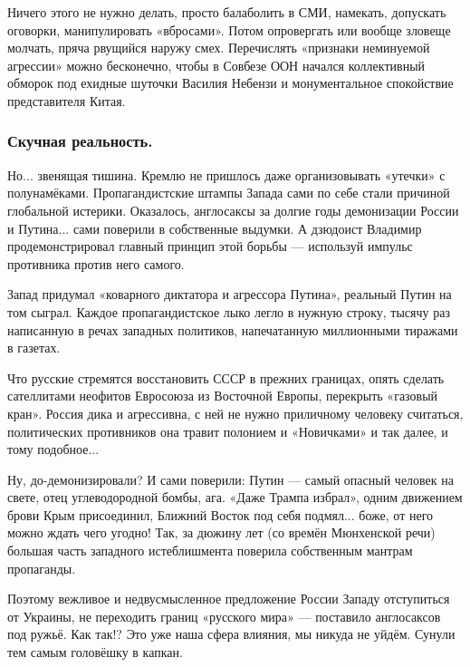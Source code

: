 
Ничего этого не нужно делать, просто балаболить в СМИ, намекать, допускать
оговорки, манипулировать «вбросами». Потом опровергать или вообще зловеще
молчать, пряча рвущийся наружу смех. Перечислять «признаки неминуемой агрессии»
можно бесконечно, чтобы в Совбезе ООН начался коллективный обморок под ехидные
шуточки Василия Небензи и монументальное спокойствие представителя Китая.

\subsubsection{Скучная реальность.}

Но... звенящая тишина. Кремлю не пришлось даже организовывать «утечки» с
полунамёками. Пропагандистские штампы Запада сами по себе стали причиной
глобальной истерики. Оказалось, англосаксы за долгие годы демонизации России и
Путина... сами поверили в собственные выдумки. А дзюдоист Владимир
продемонстрировал главный принцип этой борьбы — используй импульс противника
против него самого.

Запад придумал «коварного диктатора и агрессора Путина», реальный Путин на том
сыграл. Каждое пропагандистское лыко легло в нужную строку, тысячу раз
написанную в речах западных политиков, напечатанную миллионными тиражами в
газетах.

Что русские стремятся восстановить СССР в прежних границах, опять сделать
сателлитами неофитов Евросоюза из Восточной Европы, перекрыть «газовый кран».
Россия дика и агрессивна, с ней не нужно приличному человеку считаться,
политических противников она травит полонием и «Новичками» и так далее, и тому
подобное...

Ну, до-демонизировали? И сами поверили: Путин — самый опасный человек на свете,
отец углеводородной бомбы, ага. «Даже Трампа избрал», одним движением брови
Крым присоединил, Ближний Восток под себя подмял... боже, от него можно ждать
чего угодно! Так, за дюжину лет (со времён Мюнхенской речи) большая часть
западного истеблишмента поверила собственным мантрам пропаганды.


Поэтому вежливое и недвусмысленное предложение России Западу отступиться от
Украины, не переходить границ «русского мира» — поставило англосаксов под
ружьё. Как так!? Это уже наша сфера влияния, мы никуда не уйдём. Сунули тем
самым головёшку в капкан.

